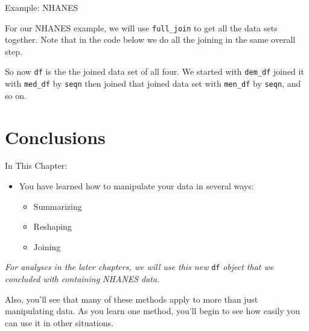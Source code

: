 \begin{frame}[fragile]{Example: NHANES}

For our NHANES example, we will use \texttt{full\_join} to get all the
data sets together. Note that in the code below we do all the joining in
the same overall step.

\begin{Shaded}
\end{Shaded}

So now \texttt{df} is the the joined data set of all four. We started
with \texttt{dem\_df} joined it with \texttt{med\_df} by \texttt{seqn}
then joined that joined data set with \texttt{men\_df} by \texttt{seqn},
and so on.

\end{frame}

\section{Conclusions}\label{conclusions}

\begin{frame}[fragile]{In This Chapter:}

\begin{itemize}
\tightlist
\item
  You have learned how to manipulate your data in several ways:

  \begin{itemize}
  \tightlist
  \item
    Summarizing
  \item
    Reshaping
  \item
    Joining
  \end{itemize}
\end{itemize}

\emph{For analyses in the later chapters, we will use this new}
\texttt{df} \emph{object that we concluded with containing NHANES data.}

Also, you'll see that many of these methods apply to more than just
manipulating data. As you learn one method, you'll begin to see how
easily you can use it in other situations.

\end{frame}

